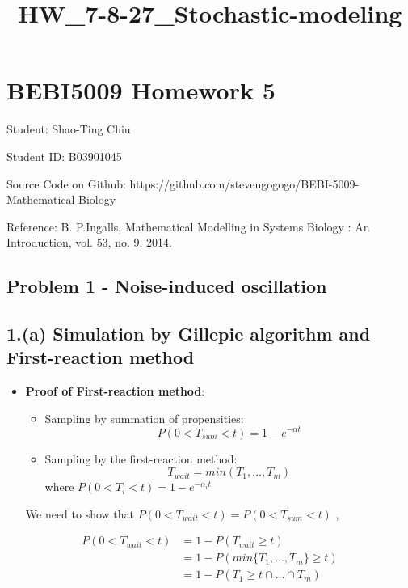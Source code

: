 \documentclass[11pt]{article}
\title{HW\_7-8-27\_Stochastic-modeling}
\begin{document}
    
    
    \maketitle
    
    

    
    \section{BEBI5009 Homework 5}\label{bebi5009-homework-5}

Student: Shao-Ting Chiu

Student ID: B03901045

Source Code on Github:
https://github.com/stevengogogo/BEBI-5009-Mathematical-Biology

Reference: B. P.Ingalls, Mathematical Modelling in Systems Biology : An
Introduction, vol. 53, no. 9. 2014.

    \subsection{Problem 1 - Noise-induced
oscillation}\label{problem-1---noise-induced-oscillation}

    

    \subsection{1.(a) Simulation by Gillepie algorithm and First-reaction
method}\label{a-simulation-by-gillepie-algorithm-and-first-reaction-method}

\begin{itemize}
\item
  \textbf{Proof of First-reaction method}:

  \begin{itemize}
  \item
    Sampling by summation of propensities:
    \[P(0<T_{sum}<t) = 1 - e^{-\alpha t}\]
  \item
    Sampling by the first-reaction method: \[T_{wait}=min(T_1,...,T_m)\]
    where \(P(0<T_i<t) = 1-e^{-\alpha_{i}t}\)
  \end{itemize}

  We need to show that \(P(0 < T_{wait} < t) = P(0 < T_{sum} < t)\) ,
\end{itemize}

\begin{align}
P(0<T_{wait}<t) &= 1 - P(T_{wait} \geq t) \\
                &= 1 - P(min\{T_1,...,T_m\} \geq t) \\
                &= 1 - P(T_1 \geq t \cap ... \cap T_m) \\
\end{align}
\end{document}
